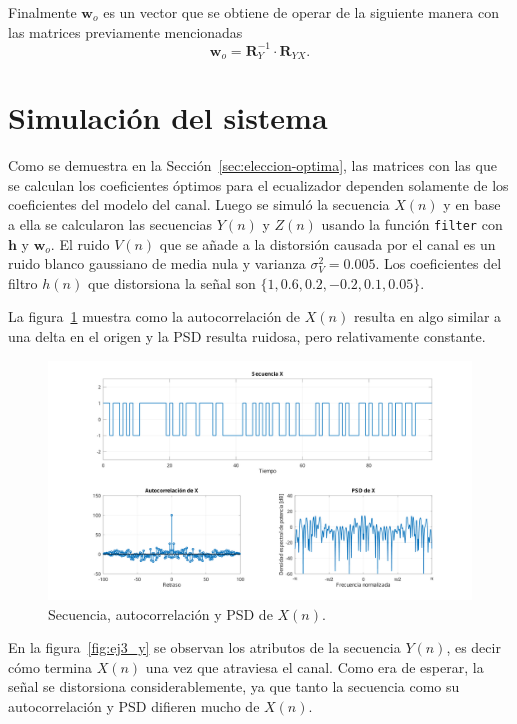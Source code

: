 Finalmente $\mathbf{w}_o$ es un vector que se obtiene de operar de la siguiente manera con las matrices previamente mencionadas
\begin{equation*}
	\mathbf{w}_o = \mathbf{R}_Y^{-1} \cdot \mathbf{R}_{YX}.
\end{equation*}

\section{Simulación del sistema}

Como se demuestra en la Sección~\ref{sec:eleccion-optima}, las matrices con las que se calculan los coeficientes óptimos para el ecualizador dependen solamente de los coeficientes del modelo del canal. Luego se simuló la secuencia $X(n)$ y en base a ella se calcularon las secuencias $Y(n)$ y $Z(n)$ usando la función \verb|filter| con $\mathbf{h}$ y $\mathbf{w}_o$. El ruido $V(n)$ que se añade a la distorsión causada por el canal es un ruido blanco gaussiano de media nula y varianza $\sigma_V^2 = 0.005$. Los coeficientes del filtro $h(n)$ que distorsiona la señal son $\{1, 0.6, 0.2, -0.2, 0.1, 0.05\}$.

La figura~\ref{fig:ej3_x} muestra como la autocorrelación de $X(n)$ resulta en algo similar a una delta en el origen y la PSD resulta ruidosa, pero relativamente constante.

\begin{figure}[!hbp]
	\centering
    \includegraphics[width=1\linewidth,trim=4cm 0 4cm 0,clip]{img/ej3_x.pdf}
	\caption{Secuencia, autocorrelación y PSD de $X(n)$.}
	\label{fig:ej3_x}
\end{figure}

En la figura~\ref{fig:ej3_y} se observan los atributos de la secuencia $Y(n)$, es decir cómo termina $X(n)$ una vez que atraviesa el canal. Como era de esperar, la señal se distorsiona considerablemente, ya que tanto la secuencia como su autocorrelación y PSD difieren mucho de $X(n)$.

